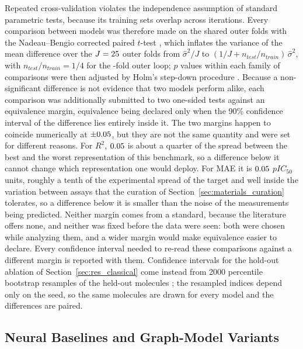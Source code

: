 Repeated cross-validation violates the independence assumption of standard parametric tests, because its training sets
overlap across iterations. Every comparison between models was therefore made on the shared outer folds with the
Nadeau--Bengio corrected paired $t$-test \citep{nadeau2003}, which inflates the variance of the mean difference over the
$J = 25$ outer folds from $\hat{\sigma}^2/J$ to $(1/J + n_{test}/n_{train})\,\hat{\sigma}^2$, with
$n_{test}/n_{train} = 1/4$ for the \OuterKFolds-fold outer loop; $p$ values within each family of comparisons were then
adjusted by Holm's step-down procedure \citep{holm1979}. Because a non-significant difference is not evidence that two
models perform alike, each comparison was additionally submitted to two one-sided tests \citep{schuirmann1987} against
an equivalence margin, equivalence being declared only when the 90\% confidence interval of the difference lies
entirely inside it. The two margins happen to coincide numerically at $\pm 0.05$, but they are not the same
quantity and were set for different reasons. For $R^2$, $0.05$ is about a quarter of the spread between the
best and the worst representation of this benchmark, so a difference below it cannot change which representation one
would deploy. For MAE it is $0.05$ $pIC_{50}$ units, roughly a tenth of the experimental spread of the
target and well inside the variation between assays that the curation of Section~\ref{sec:materials_curation} tolerates,
so a difference below it is smaller than the noise of the measurements being predicted. Neither margin comes from a
standard, because the literature offers none, and neither was fixed before the data were seen: both were chosen while
analyzing them, and a wider margin would make equivalence easier to declare. Every confidence interval needed to
re-read these comparisons against a different margin is reported with them. Confidence intervals for the hold-out
ablation of Section~\ref{sec:res_classical} come instead from 2000 percentile bootstrap resamples of the held-out
molecules \citep{efron1993}; the resampled indices depend only on the seed, so the same molecules are drawn for every
model and the differences are paired.

\subsection{Neural Baselines and Graph-Model Variants}
\label{sec:materials_gnn}

